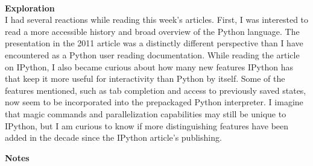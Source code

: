 \documentclass{report}
\newcommand{\tab}{\-\hspace{1cm}}
\begin{document}
\-\\
\textbf{Exploration}\\
\tab I had several reactions while reading this week's articles. First, I was interested to read a more accessible history and broad overview of the Python language. The presentation in the 2011 article was a distinctly different perspective than I have encountered as a Python user reading documentation. While reading the article on IPython, I also became curious about how many new features IPython has that keep it more useful for interactivity than Python by itself. Some of the features mentioned, such as tab completion and access to previously saved states, now seem to be incorporated into the prepackaged Python interpreter. I imagine that magic commands and parallelization capabilities may still be unique to IPython, but I am curious to know if more distinguishing features have been added in the decade since the IPython article's publishing.

\newpage

\textbf{Notes}\\
\end{document}
